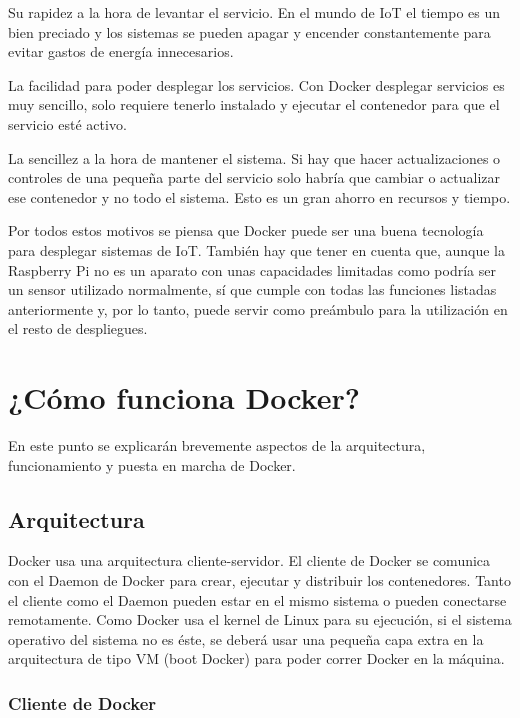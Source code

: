 Su rapidez a la hora de levantar el servicio. En el mundo de IoT el tiempo es un bien
preciado y los sistemas se pueden apagar y encender constantemente para evitar gastos de energía innecesarios.

La facilidad para poder desplegar los servicios. Con Docker desplegar servicios es muy sencillo, solo requiere tenerlo instalado y ejecutar el contenedor para que el servicio esté activo.

La sencillez a la hora de mantener el sistema. Si hay que hacer actualizaciones o controles de una pequeña parte del servicio solo habría que cambiar o actualizar ese contenedor y no todo el sistema. Esto es un gran ahorro en recursos y tiempo. 

Por todos estos motivos se piensa que Docker puede ser una buena tecnología para desplegar sistemas de IoT. También hay que tener en cuenta que, aunque la Raspberry Pi no es un aparato con unas capacidades limitadas como podría ser un sensor utilizado normalmente, sí que cumple con todas las funciones listadas anteriormente y, por lo tanto, puede servir como preámbulo para la utilización en el resto de despliegues.  

\section{¿Cómo funciona Docker?}

En este punto se explicarán brevemente aspectos de la arquitectura, funcionamiento y
puesta en marcha de Docker.  

\subsection{Arquitectura}

Docker usa una arquitectura cliente-servidor. El cliente de Docker se comunica con el
Daemon de Docker para crear, ejecutar y distribuir los contenedores. Tanto el cliente como el Daemon pueden estar en el mismo sistema o pueden conectarse remotamente.
Como Docker usa el kernel de Linux para su ejecución, si el sistema operativo del sistema no es éste, se deberá usar una pequeña capa extra en la arquitectura de tipo VM (boot Docker) para poder correr Docker en la máquina.\newline

\subsubsection{Cliente de Docker}

